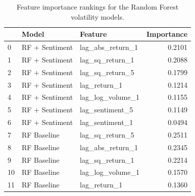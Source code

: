 \begin{table}
\caption{Feature importance rankings for the Random Forest volatility models.}
\label{tab:rf_feature_importance}
\begin{tabular}{lllr}
\toprule
 & Model & Feature & Importance \\
\midrule
0 & RF + Sentiment & lag_abs_return_1 & 0.2101 \\
1 & RF + Sentiment & lag_sq_return_1 & 0.2088 \\
2 & RF + Sentiment & lag_sq_return_5 & 0.1799 \\
3 & RF + Sentiment & lag_return_1 & 0.1214 \\
4 & RF + Sentiment & lag_log_volume_1 & 0.1155 \\
5 & RF + Sentiment & lag_sentiment_5 & 0.1149 \\
6 & RF + Sentiment & lag_sentiment_1 & 0.0494 \\
7 & RF Baseline & lag_sq_return_5 & 0.2511 \\
8 & RF Baseline & lag_abs_return_1 & 0.2345 \\
9 & RF Baseline & lag_sq_return_1 & 0.2214 \\
10 & RF Baseline & lag_log_volume_1 & 0.1570 \\
11 & RF Baseline & lag_return_1 & 0.1360 \\
\bottomrule
\end{tabular}
\end{table}
